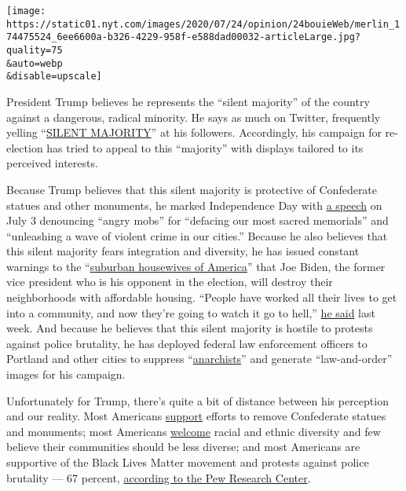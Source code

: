\texttt{[image: https://static01.nyt.com/images/2020/07/24/opinion/24bouieWeb/merlin\_174475524\_6ee6600a-b326-4229-958f-e588dad00032-articleLarge.jpg?quality=75\\\&auto=webp\\\&disable=upscale]}

President Trump believes he represents the ``silent majority'' of the
country against a dangerous, radical minority. He says as much on
Twitter, frequently yelling
``\href{https://twitter.com/realdonaldtrump/status/1277219673315119106?s=21}{SILENT
MAJORITY}'' at his followers. Accordingly, his campaign for re-election
has tried to appeal to this ``majority'' with displays tailored to its
perceived interests.

Because Trump believes that this silent majority is protective of
Confederate statues and other monuments, he marked Independence Day with
\href{https://www.whitehouse.gov/briefings-statements/remarks-president-trump-south-dakotas-2020-mount-rushmore-fireworks-celebration-keystone-south-dakota/}{a
speech} on July 3 denouncing ``angry mobs'' for ``defacing our most
sacred memorials'' and ``unleashing a wave of violent crime in our
cities.'' Because he also believes that this silent majority fears
integration and diversity, he has issued constant warnings to the
``\href{https://twitter.com/realdonaldtrump/status/1286372175117791236?s=21}{suburban
housewives of America}'' that Joe Biden, the former vice president who
is his opponent in the election, will destroy their neighborhoods with
affordable housing. ``People have worked all their lives to get into a
community, and now they're going to watch it go to hell,''
\href{https://www.npr.org/2020/07/22/893899254/down-in-the-polls-trump-pitches-fear-they-want-to-destroy-our-suburbs}{he
said} last week. And because he believes that this silent majority is
hostile to protests against police brutality, he has deployed federal
law enforcement officers to Portland and other cities to suppress
``\href{https://www.nytimes.com/2020/07/21/us/portland-protests.html}{anarchists}''
and generate ``law-and-order'' images for his campaign.

Unfortunately for Trump, there's quite a bit of distance between his
perception and our reality. Most Americans
\href{https://www.cnn.com/2020/06/18/politics/confederate-statues-removal-robert-e-lee-jefferson/index.html}{support}
efforts to remove Confederate statues and monuments; most Americans
\href{https://www.pewsocialtrends.org/2019/05/08/americans-see-advantages-and-challenges-in-countrys-growing-racial-and-ethnic-diversity/}{welcome}
racial and ethnic diversity and few believe their communities should be
less diverse; and most Americans are supportive of the Black Lives
Matter movement and protests against police brutality --- 67 percent,
\href{https://www.pewsocialtrends.org/2020/06/12/amid-protests-majorities-across-racial-and-ethnic-groups-express-support-for-the-black-lives-matter-movement/}{according
to the Pew Research Center}.

